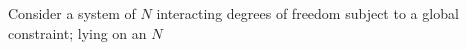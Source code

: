 Consider a system of $N$ interacting degrees of freedom subject to a global constraint; lying on an $N$